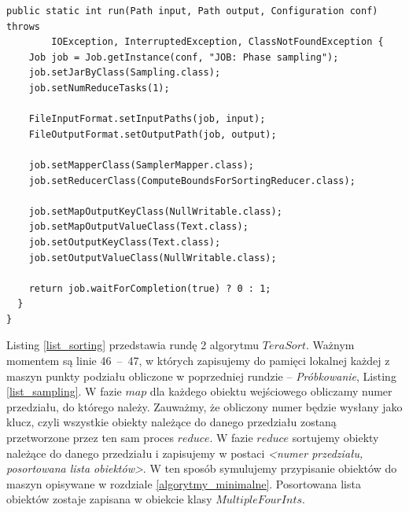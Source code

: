 \documentclass[magisterska]{pracamgr}
\begin{document}
\begin{lstlisting}[language=SmallJava,firstnumber=1,label=list_sampling,caption=Faza próbkowania danych]
  public static int run(Path input, Path output, Configuration conf) throws
        IOException, InterruptedException, ClassNotFoundException {
    Job job = Job.getInstance(conf, "JOB: Phase sampling");
    job.setJarByClass(Sampling.class);
    job.setNumReduceTasks(1);

    FileInputFormat.setInputPaths(job, input);
    FileOutputFormat.setOutputPath(job, output);

    job.setMapperClass(SamplerMapper.class);
    job.setReducerClass(ComputeBoundsForSortingReducer.class);

    job.setMapOutputKeyClass(NullWritable.class);
    job.setMapOutputValueClass(Text.class);
    job.setOutputKeyClass(Text.class);
    job.setOutputValueClass(NullWritable.class);

    return job.waitForCompletion(true) ? 0 : 1;
  }
}
\end{lstlisting}

\newpage
Listing \ref{list_sorting} przedstawia rundę 2 algorytmu \(TeraSort\). Ważnym momentem są linie \mbox{46 -- 47}, w których zapisujemy do pamięci lokalnej każdej z maszyn punkty podziału obliczone w poprzedniej rundzie -- \textit{Próbkowanie}, Listing \ref{list_sampling}. W fazie \(map\) dla każdego obiektu wejściowego obliczamy numer przedziału, do którego należy. Zauważmy, że obliczony numer będzie wysłany jako klucz, czyli wszystkie obiekty należące do danego przedziału zostaną przetworzone przez ten sam proces \(reduce\). W fazie \(reduce\) sortujemy obiekty należące do danego przedziału i zapisujemy w postaci \textit{<numer przedziału, posortowana lista obiektów>}. W ten sposób symulujemy przypisanie obiektów do maszyn opisywane w rozdziale \ref{algorytmy_minimalne}. Posortowana lista obiektów zostaje zapisana w obiekcie klasy \(MultipleFourInts\). 
\end{document}
